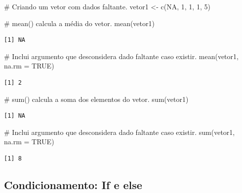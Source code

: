 \documentclass[
  letterpaper,
  DIV=11,
  numbers=noendperiod]{scrreprt}
\newenvironment{Shaded}{\begin{snugshade}}{\end{snugshade}}
\newcommand{\AttributeTok}[1]{\textcolor[rgb]{0.40,0.45,0.13}{#1}}
\newcommand{\CommentTok}[1]{\textcolor[rgb]{0.37,0.37,0.37}{#1}}
\newcommand{\ConstantTok}[1]{\textcolor[rgb]{0.56,0.35,0.01}{#1}}
\newcommand{\DecValTok}[1]{\textcolor[rgb]{0.68,0.00,0.00}{#1}}
\newcommand{\FunctionTok}[1]{\textcolor[rgb]{0.28,0.35,0.67}{#1}}
\newcommand{\NormalTok}[1]{\textcolor[rgb]{0.00,0.23,0.31}{#1}}
\newcommand{\OtherTok}[1]{\textcolor[rgb]{0.00,0.23,0.31}{#1}}
\begin{document}
\begin{Shaded}
\begin{Highlighting}[]
\CommentTok{\# Criando um vetor com dados faltante.}
\NormalTok{vetor1 }\OtherTok{\textless{}{-}} \FunctionTok{c}\NormalTok{(}\ConstantTok{NA}\NormalTok{, }\DecValTok{1}\NormalTok{, }\DecValTok{1}\NormalTok{, }\DecValTok{1}\NormalTok{, }\DecValTok{5}\NormalTok{)}

\CommentTok{\# mean() calcula a média do vetor.}
\FunctionTok{mean}\NormalTok{(vetor1)}
\end{Highlighting}
\end{Shaded}

\begin{verbatim}
[1] NA
\end{verbatim}

\begin{Shaded}
\begin{Highlighting}[]
\CommentTok{\# Inclui argumento que desconsidera dado faltante caso existir.}
\FunctionTok{mean}\NormalTok{(vetor1, }\AttributeTok{na.rm =} \ConstantTok{TRUE}\NormalTok{)}
\end{Highlighting}
\end{Shaded}

\begin{verbatim}
[1] 2
\end{verbatim}

\begin{Shaded}
\begin{Highlighting}[]
\CommentTok{\# sum() calcula a soma dos elementos do vetor.}
\FunctionTok{sum}\NormalTok{(vetor1)}
\end{Highlighting}
\end{Shaded}

\begin{verbatim}
[1] NA
\end{verbatim}

\begin{Shaded}
\begin{Highlighting}[]
\CommentTok{\# Inclui argumento que desconsidera dado faltante caso existir.}
\FunctionTok{sum}\NormalTok{(vetor1, }\AttributeTok{na.rm =} \ConstantTok{TRUE}\NormalTok{)}
\end{Highlighting}
\end{Shaded}

\begin{verbatim}
[1] 8
\end{verbatim}

\hypertarget{condicionamento-if-e-else}{%
\subsection{Condicionamento: If e
else}\label{condicionamento-if-e-else}}
\end{document}
